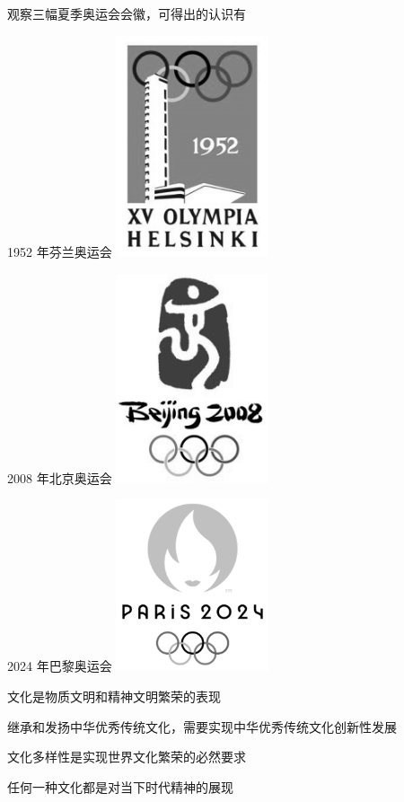 \documentclass{exam-zh}
\begin{document}
\begin{question}
  观察三幅夏季奥运会会徽，可得出的认识有

  \begin{multifigures}
    \item[1952 年芬兰奥运会] \includegraphics[width=4.5cm]{helsinki.png}
    \item[2008 年北京奥运会] \includegraphics[width=4.5cm]{beijing.png}
    \item[2024 年巴黎奥运会] \includegraphics[width=4.5cm]{paris.png}
  \end{multifigures}

   文化是物质文明和精神文明繁荣的表现

   继承和发扬中华优秀传统文化，需要实现中华优秀传统文化创新性发展

   文化多样性是实现世界文化繁荣的必然要求

   任何一种文化都是对当下时代精神的展现

  \begin{choices}
  \item {}
  \item {}
  \item {}
  \item {}
  \end{choices}
\end{question}
\end{document}
